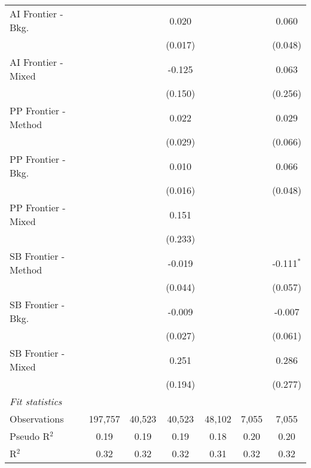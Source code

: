 \begin{tabular}{lcccccc}
   AI Frontier - Bkg.   &               &               & 0.020        &              &              & 0.060\\   
                        &               &               & (0.017)      &              &              & (0.048)\\   
   AI Frontier - Mixed  &               &               & -0.125       &              &              & 0.063\\   
                        &               &               & (0.150)      &              &              & (0.256)\\   
   PP Frontier - Method &               &               & 0.022        &              &              & 0.029\\   
                        &               &               & (0.029)      &              &              & (0.066)\\   
   PP Frontier - Bkg.   &               &               & 0.010        &              &              & 0.066\\   
                        &               &               & (0.016)      &              &              & (0.048)\\   
   PP Frontier - Mixed  &               &               & 0.151        &              &              &   \\   
                        &               &               & (0.233)      &              &              &   \\   
   SB Frontier - Method &               &               & -0.019       &              &              & -0.111$^{*}$\\   
                        &               &               & (0.044)      &              &              & (0.057)\\   
   SB Frontier - Bkg.   &               &               & -0.009       &              &              & -0.007\\   
                        &               &               & (0.027)      &              &              & (0.061)\\   
   SB Frontier - Mixed  &               &               & 0.251        &              &              & 0.286\\   
                        &               &               & (0.194)      &              &              & (0.277)\\   
   \midrule
   \emph{Fit statistics}\\
   Observations         & 197,757       & 40,523        & 40,523       & 48,102       & 7,055        & 7,055\\  
   Pseudo R$^2$         & 0.19          & 0.19          & 0.19         & 0.18         & 0.20         & 0.20\\  
   R$^2$                & 0.32          & 0.32          & 0.32         & 0.31         & 0.32         & 0.32\\  
   

\end{tabular}
